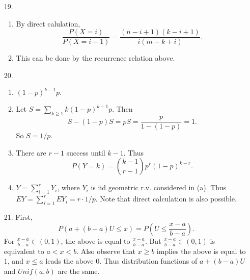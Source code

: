 \documentclass{article}
\begin{document}
\begin{enumerate}
	\item[19.]
		\begin{enumerate}[label = (\alph*)]
			\item By direct calulation,
				\[
					\frac{P(X=i)}{P(X = i-1)} = \frac{(n-i+1)(k-i+1)}{i(m-k+i)}.
				\]

			\item This can be done by the recurrence relation above.
		\end{enumerate}

	\item[20.]
		\begin{enumerate}[label = (\alph*)]
			\item $(1-p)^{k-1}p.$

			\item Let $S = \sum_{k\ge 1} k(1-p)^{k-1}p$.
				Then 
				\[
					S - (1-p)S = pS = \frac{p}{1-(1-p)}= 1.
				\]
				So $S = 1/p$.

			\item There are $r-1$ success until $k-1$.
			Thus 
			\[
				P(Y = k) = {k-1 \choose r-1} p^r (1-p)^{k-r}.
			\]

			\item $Y = \sum_{i=1}^r Y_i$, where $Y_i$ is iid geometric r.v. considered in (a).
				Thus $EY = \sum_{i=1}^rEY_i = r \cdot 1/p$.
				Note that direct calculation is also possible.
		\end{enumerate}

	\item[21.] First,
		\[
			P(a+(b-a)U \le x) = P\left( U \le \frac{x-a}{b-a} \right).
		\]
		For  $\frac{x-a}{b-a} \in (0, 1)$, the above is equal to $\frac{x-a}{b-a}$.
		But $\frac{x-a}{b-a} \in (0, 1)$ is equivalent to $a < x < b$.
		Also observe that $x \ge b$ implies the above is equal to $1$, and $x \le a$ leads the above $0$.
		Thus distribution functions of $a+(b-a)U$ and $Unif(a, b)$ are the same.
\end{enumerate}
\end{document}
